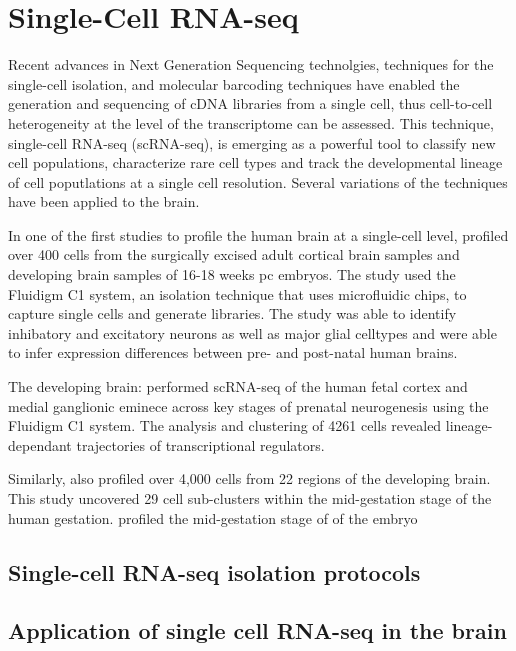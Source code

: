 \documentclass[12pt]{article}
\begin{document}
    \section{Single-Cell RNA-seq}
    Recent advances in Next Generation Sequencing technolgies, techniques for the single-cell isolation, and  molecular  barcoding  techniques  have  enabled  the  generation  and  sequencing  of cDNA libraries from a single cell, thus cell-to-cell heterogeneity at the level of the transcriptome can be assessed. This technique, single-cell RNA-seq (scRNA-seq), is emerging as a powerful tool to classify new  cell  populations, characterize rare cell types and track the developmental lineage of cell poputlations at a single cell resolution. Several variations of the techniques have been applied to the brain. 
    
    In one of the first studies to profile the human brain at a single-cell level, \cite{darmanis2015survey} profiled over 400 cells from the surgically excised adult cortical brain samples and developing brain samples of 16-18 weeks pc embryos. The study used the Fluidigm C1 system, an isolation technique that uses microfluidic chips, to capture single cells and generate libraries. The study was able to identify inhibatory and excitatory neurons as well as major glial celltypes and were able to infer expression differences between pre- and post-natal human brains. 
    
    The developing brain: \cite{nowakowski2017spatiotemporal} performed scRNA-seq of the human fetal cortex and medial ganglionic eminece across key stages of prenatal neurogenesis using the Fluidigm C1 system. 
    The analysis and clustering of 4261 cells revealed lineage-dependant trajectories of transcriptional regulators. 
    
    
    Similarly, \cite{fan2018spatial} also profiled over 4,000 cells from 22 regions of the developing brain. This study uncovered 29 cell sub-clusters within the mid-gestation stage of the human gestation. \cite{polioudakis2019single} profiled the mid-gestation stage of of the embryo 
    
 
    
    \subsection{Single-cell RNA-seq isolation protocols}
    \subsection{Application of single cell RNA-seq in the brain}
    
\end{document}

